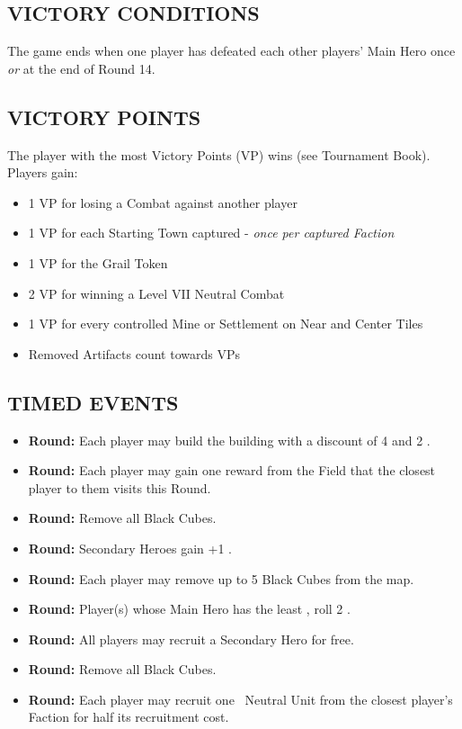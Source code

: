 \begin{multicols*}{2}
\subsection*{\MakeUppercase{Victory Conditions}}
The game ends when one player has defeated each other players' Main Hero once \textit{or} at the end of Round 14.

\subsection*{\MakeUppercase{Victory Points}}
The player with the most Victory Points (VP) wins (see Tournament Book). Players gain:

\begin{itemize}
  \item 1 VP for losing a Combat against another player
  \item 1 VP for each Starting Town captured - \textit{once per captured Faction}
  \item 1 VP for the Grail Token
  \item 2 VP for winning a Level VII Neutral Combat
  \item 1 VP for every controlled Mine or Settlement on Near and Center Tiles
  \item Removed Artifacts count towards VPs
\end{itemize}

\subsection*{\MakeUppercase{Timed Events}}

\begin{itemize}
  \item[\textbf{\nth{1}}] \textbf{Round:} Each player may build the  building with a discount of 4  and 2 .
  \item[\textbf{\nth{2}}] \textbf{Round:} Each player may gain one reward from the Field that the closest player to them visits this Round.
  \item[\textbf{\nth{4}}] \textbf{Round:} Remove all Black Cubes.
  \item[\textbf{\nth{6}}] \textbf{Round:} Secondary Heroes gain +1 .
  \item[\textbf{\nth{8}}] \textbf{Round:} Each player may remove up to 5 Black Cubes from the map.
  \item[\textbf{\nth{9}}] \textbf{Round:} Player(s) whose Main Hero has the least , roll 2 .
  \item[\textbf{\nth{10}}] \textbf{Round:} All players may recruit a Secondary Hero for free.
  \item[\textbf{\nth{11}}] \textbf{Round:} Remove all Black Cubes.
  \item[\textbf{\nth{12}}] \textbf{Round:} Each player may recruit one \silver\ Neutral Unit from the closest player's Faction for half its recruitment cost.
\end{itemize}


\end{multicols*}
